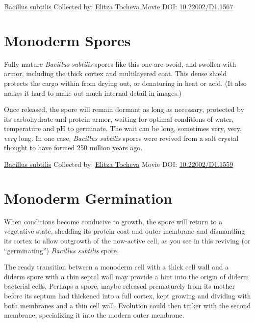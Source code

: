 \documentclass[]{tufte-book}
\begin{document}
\hypertarget{htmlwidget-aef64ac0bd4f87b706a2}{}

\label{fig:8-6b}\protect\hyperlink{tree}{Bacillus subtilis} Collected by: \protect\hyperlink{elitza_tocheva}{Elitza Tocheva} Movie DOI: \href{https://doi.org/10.22002/D1.1567}{10.22002/D1.1567}

\hypertarget{monoderm-spores}{%
\section{Monoderm Spores}\label{monoderm-spores}}

Fully mature \emph{Bacillus subtilis} spores like this one are ovoid, and swollen with armor, including the thick cortex and multilayered coat. This dense shield protects the cargo within from drying out, or denaturing in heat or acid. (It also makes it hard to make out much internal detail in images.)

Once released, the spore will remain dormant as long as necessary, protected by its carbohydrate and protein armor, waiting for optimal conditions of water, temperature and pH to germinate. The wait can be long, sometimes very, very, \emph{very} long. In one case, \emph{Bacillus subtilis} spores were revived from a salt crystal thought to have formed 250 million years ago.



\hypertarget{htmlwidget-53954df70f7862da4dc0}{}

\label{fig:8-7}\protect\hyperlink{tree}{Bacillus subtilis} Collected by: \protect\hyperlink{elitza_tocheva}{Elitza Tocheva} Movie DOI: \href{https://doi.org/10.22002/D1.1559}{10.22002/D1.1559}

\hypertarget{monoderm-germination}{%
\section{Monoderm Germination}\label{monoderm-germination}}

When conditions become conducive to growth, the spore will return to a vegetative state, shedding its protein coat and outer membrane and dismantling its cortex to allow outgrowth of the now-active cell, as you see in this reviving (or ``germinating'') \emph{Bacillus subtilis} spore.

The ready transition between a monoderm cell with a thick cell wall and a diderm spore with a thin septal wall may provide a hint into the origin of diderm bacterial cells. Perhaps a spore, maybe released prematurely from its mother before its septum had thickened into a full cortex, kept growing and dividing with both membranes and a thin cell wall. Evolution could then tinker with the second membrane, specializing it into the modern outer membrane.
\end{document}
